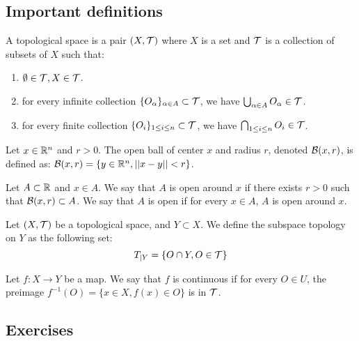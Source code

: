 \subsection{Important definitions}

\begin{definition}
    A topological space is a pair $(X, \mathcal{T})$ where $X$ is a set and $\mathcal{T}$ is a
    collection of subsets of $X$ such that:
    \begin{enumerate}
        \item $\emptyset \in \mathcal{T}, X \in \mathcal{T}$. 
        \item for every infinite collection $\{O_{\alpha}\}_{\alpha \in A}\subset \mathcal{T}$, we have $\bigcup_{\alpha \in A} O_{\alpha} \in \mathcal{T}$.
        \item for every finite collection $\{O_{i}\}_{1 \le i \le n}
        \subset \mathcal{T}$, we have $\bigcap_{1 \le i \le n} O_{i} \in \mathcal{T}$.
    \end{enumerate}   
\end{definition}

\begin{definition}
    Let $x \in \mathbb{R}^n$ and $r > 0$. The open ball of center $x$ and radius $r$,
    denoted $\mathcal{B}(x, r)$, is defined as: $\mathcal{B}(x, r) = \{y \in \mathbb{R}^n, ||x - y|| < r\}$.
\end{definition}

\begin{definition}
    Let $A \subset \mathbb{R}$ and $x \in A$. We say that $A$ is open
    around $x$ if there exists $r > 0$ such that $\mathcal{B}(x, r) \subset A$. We say
    that $A$ is open if for every $x \in A$, $A$ is open around $x$.
\end{definition}

\begin{definition}
    Let $(X, \mathcal{T})$ be a topological space, and $Y \subset X$. We define the subspace topology on $Y$ as the following set:
    $$T_{|Y} = \{O \cap Y, O \in \mathcal{T}\}$$
\end{definition}

\begin{definition}
    Let $f : X \to Y$ be a map. We say that $f$ is continuous if for every
    $O \in U$, the preimage $f^{-1}(O) = \{x \in X, f(x) \in O\}$ is in $\mathcal{T}$.
\end{definition}

\subsection{Exercises}

